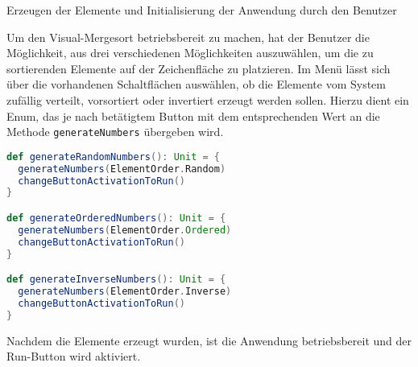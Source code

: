 Erzeugen der Elemente und Initialisierung der Anwendung durch den Benutzer

Um den Visual-Mergesort betriebsbereit zu machen, hat der Benutzer die Möglichkeit, aus drei verschiedenen Möglichkeiten auszuwählen, um die zu sortierenden Elemente auf der Zeichenfläche zu platzieren. Im Menü lässt sich über die vorhandenen Schaltflächen auswählen, ob die Elemente vom System zufällig verteilt, vorsortiert oder invertiert erzeugt werden sollen. Hierzu dient ein Enum, das je nach betätigtem Button mit dem entsprechenden Wert an die Methode \texttt{generateNumbers} übergeben wird.

\begin{lstlisting}[language=Scala]
def generateRandomNumbers(): Unit = {
  generateNumbers(ElementOrder.Random)
  changeButtonActivationToRun()
}

def generateOrderedNumbers(): Unit = {
  generateNumbers(ElementOrder.Ordered)
  changeButtonActivationToRun()
}

def generateInverseNumbers(): Unit = {
  generateNumbers(ElementOrder.Inverse)
  changeButtonActivationToRun()
}
\end{lstlisting}

Nachdem die Elemente erzeugt wurden, ist die Anwendung betriebsbereit und der Run-Button wird aktiviert.

